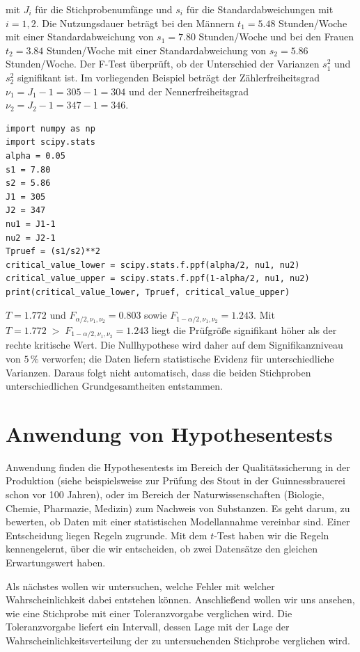 mit $J_i$ für die Stichprobenumfänge und $s_i$ für die Standardabweichungen mit $i=1,2$.
Die Nutzungsdauer beträgt bei den Männern $t_1 = 5.48$ Stunden/Woche
mit einer Standardabweichung von
$s_1 = 7.80$ Stunden/Woche und bei den Frauen
$t_2 = 3.84$ Stunden/Woche mit einer Standardabweichung von $s_2 = 5.86$ Stunden/Woche.
Der F-Test überprüft, ob der Unterschied der Varianzen $s_1^2$ und $s_2^2$ signifikant ist.
Im vorliegenden Beispiel beträgt der Zählerfreiheitsgrad $\nu_1 = J_1 - 1 = 305-1 = 304$ und der
Nennerfreiheitsgrad $\nu_2 = J_2 - 1 = 347-1 = 346$.

\begin{lstlisting}[style=Python]
import numpy as np
import scipy.stats
alpha = 0.05
s1 = 7.80
s2 = 5.86
J1 = 305
J2 = 347
nu1 = J1-1
nu2 = J2-1
Tpruef = (s1/s2)**2
critical_value_lower = scipy.stats.f.ppf(alpha/2, nu1, nu2)
critical_value_upper = scipy.stats.f.ppf(1-alpha/2, nu1, nu2)
print(critical_value_lower, Tpruef, critical_value_upper)
\end{lstlisting}
$T = 1.772$ und $F_{\alpha/2, \nu_1, \nu_2} = 0.803$ sowie
$F_{1-\alpha/2, \nu_1, \nu_2} = 1.243$. Mit $T = 1.772 \; > \; F_{1-\alpha/2, \nu_1, \nu_2} = 1.243$
liegt die Prüfgröße signifikant höher als der rechte kritische Wert.
Die Nullhypothese wird daher auf dem Signifikanzniveau von $5\,\%$ verworfen; die Daten
liefern statistische Evidenz für unterschiedliche Varianzen. Daraus folgt nicht automatisch,
dass die beiden Stichproben unterschiedlichen Grundgesamtheiten entstammen.

\section{\label{sec:EntscheidungHypoTests}Anwendung von Hypothesentests}

Anwendung finden die Hypothesentests im Bereich der Qualitätssicherung in der Produktion (siehe beispielsweise
zur Prüfung des Stout in der Guinnessbrauerei schon vor 100 Jahren), oder im Bereich der Naturwissenschaften
(Biologie, Chemie, Pharmazie, Medizin) zum Nachweis von Substanzen. Es geht darum,
zu bewerten, ob Daten mit einer statistischen Modellannahme vereinbar sind.
Einer Entscheidung liegen Regeln zugrunde. Mit dem $t$-Test haben wir die Regeln kennengelernt, über
die wir entscheiden, ob zwei Datensätze den gleichen Erwartungswert haben.

Als nächstes wollen wir untersuchen, welche Fehler mit welcher Wahrscheinlichkeit dabei entstehen können.
Anschließend wollen wir uns ansehen, wie eine Stichprobe mit einer Toleranzvorgabe verglichen wird.
Die Toleranzvorgabe liefert ein Intervall, dessen Lage mit der Lage der Wahrscheinlichkeitsverteilung
der zu untersuchenden Stichprobe verglichen wird.

